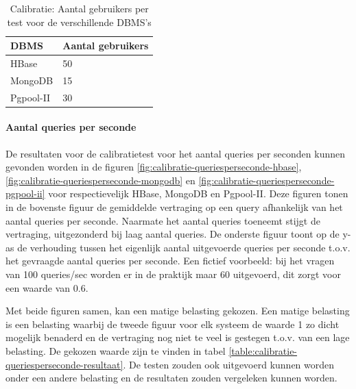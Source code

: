 \begin{table}[ht!]
	\centering
	\begin{tabular}{l| l }
		\textbf{DBMS} & Aantal gebruikers \\
		\hline
		HBase & 50 \\
		MongoDB & 15\\
		Pgpool-II & 30\\
	\end{tabular}
	\caption{Calibratie: Aantal gebruikers per test voor de verschillende DBMS's}
	\label{table:calibratie-gebruikers-resultaat}
\end{table}

\paragraph{Aantal queries per seconde}
De resultaten voor de calibratietest voor het aantal queries per seconden kunnen gevonden worden in de figuren \ref{fig:calibratie-queriesperseconde-hbase}, \ref{fig:calibratie-queriesperseconde-mongodb} en \ref{fig:calibratie-queriesperseconde-pgpool-ii} voor respectievelijk HBase, MongoDB en Pgpool-II. Deze figuren tonen in de bovenste figuur de gemiddelde vertraging op een query afhankelijk van het aantal queries per seconde. Naarmate het aantal queries toeneemt stijgt de vertraging, uitgezonderd bij laag aantal queries. De onderste figuur toont op de y-as de verhouding tussen het eigenlijk aantal uitgevoerde queries per seconde t.o.v. het gevraagde aantal queries per seconde. Een fictief voorbeeld: bij het vragen van 100 queries/sec worden er in de praktijk maar 60 uitgevoerd, dit zorgt voor een waarde van $0.6$. 

Met beide figuren samen, kan een matige belasting gekozen. Een matige belasting is een belasting waarbij de tweede figuur voor elk systeem de waarde 1 zo dicht mogelijk benaderd en de vertraging nog niet te veel is gestegen t.o.v. van een lage belasting. De gekozen waarde zijn te vinden in tabel \ref{table:calibratie-queriesperseconde-resultaat}. De testen zouden ook uitgevoerd kunnen worden onder een andere belasting en de resultaten zouden vergeleken kunnen worden. 


